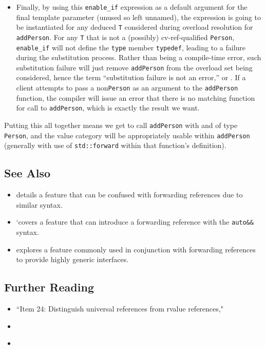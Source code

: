 \begin{itemize}
\item{Finally, by using this \lstinline!enable_if! expression as a default argument for the final template parameter (unused so left unnamed), the expression is going to be instantiated for any deduced \lstinline!T! considered during overload resolution for \lstinline!addPerson!. For any \lstinline!T! that is not a (possibly) cv-ref-qualified \lstinline!Person!, \lstinline!enable_if! will not define the \lstinline!type! member \lstinline!typedef!, leading to a failure during the substitution process.  Rather than being a compile-time error, such substitution failure will just remove \lstinline!addPerson! from the overload set being considered, hence the term “substitution failure is not an error,” or .  If a client attempts to pass a non\lstinline!Person! as an argument to the \lstinline!addPerson! function, the compiler will issue an error that there is no matching function for call to \lstinline!addPerson!, which is exactly the result we want.}
\end{itemize}
Putting this all together means we get to call \lstinline!addPerson! with
 and  of type \lstinline!Person!, and the value
category will be appropriately usable within \lstinline!addPerson!
(generally with use of \lstinline!std::forward! within that function's
definition).

\subsection[See Also]{See Also}\label{see-also}

\begin{itemize}
\item{details a feature that can be confused with forwarding references due to similar syntax.}
\item{`covers a feature that can introduce a forwarding reference with the \lstinline!auto&&! syntax.}
\item{explores a feature commonly used in conjunction with forwarding references to provide highly generic interfaces.}
\end{itemize}

\subsection[Further Reading]{Further Reading}\label{further-reading}

\begin{itemize}
\item{``Item 24: Distinguish universal references from rvalue references," \cite{meyers15}}
\item{\cite{sutter14}}
\item{\cite{niebler13}}
\end{itemize}


